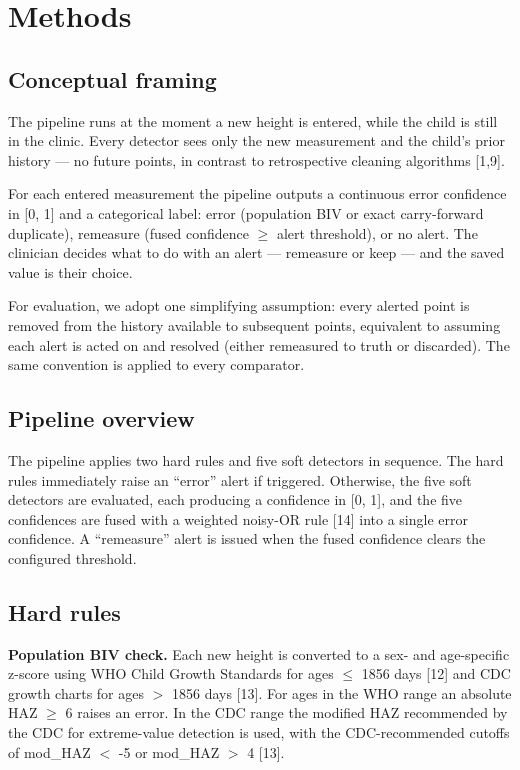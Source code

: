\documentclass[11pt]{article}
\begin{document}
\section{Methods}\label{methods}

\subsection{Conceptual framing}\label{conceptual-framing}

The pipeline runs at the moment a new height is entered, while the child is still in the clinic. Every detector sees only the new measurement and the child's prior history --- no future points, in contrast to retrospective cleaning algorithms [1,9].

For each entered measurement the pipeline outputs a continuous error confidence in [0, 1] and a categorical label: error (population BIV or exact carry-forward duplicate), remeasure (fused confidence \(\ge\) alert threshold), or no alert. The clinician decides what to do with an alert --- remeasure or keep --- and the saved value is their choice.

For evaluation, we adopt one simplifying assumption: every alerted point is removed from the history available to subsequent points, equivalent to assuming each alert is acted on and resolved (either remeasured to truth or discarded). The same convention is applied to every comparator.

\subsection{Pipeline overview}\label{pipeline-overview}

The pipeline applies two hard rules and five soft detectors in sequence. The hard rules immediately raise an ``error'' alert if triggered. Otherwise, the five soft detectors are evaluated, each producing a confidence in [0, 1], and the five confidences are fused with a weighted noisy-OR rule [14] into a single error confidence. A ``remeasure'' alert is issued when the fused confidence clears the configured threshold.

\subsection{Hard rules}\label{hard-rules}

\textbf{Population BIV check.} Each new height is converted to a sex- and age-specific z-score using WHO Child Growth Standards for ages \(\le\) 1856 days [12] and CDC growth charts for ages \(>\) 1856 days [13]. For ages in the WHO range an absolute HAZ \(\ge\) 6 raises an error. In the CDC range the modified HAZ recommended by the CDC for extreme-value detection is used, with the CDC-recommended cutoffs of mod\_HAZ \(<\) -5 or mod\_HAZ \(>\) 4 [13].
\end{document}
